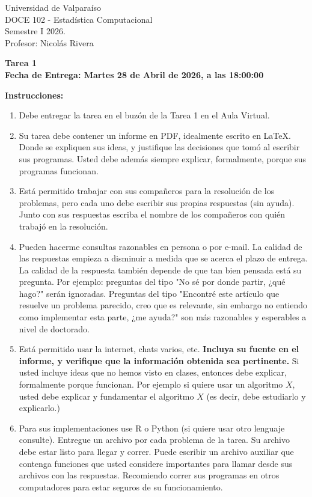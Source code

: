 \documentclass[a4paper,12 pt]{article}
\theoremstyle{definition}
\begin{document}
\begin{flushleft}
\Large{ Universidad de Valpara\'iso \\
DOCE 102 - Estadística Computacional\\
Semestre I 2026.\\
Profesor: Nicolás Rivera
}
\end{flushleft}

\begin{center}
{\Large \bf Tarea 1}\\
{\large \bf Fecha de Entrega: Martes 28 de Abril de 2026, a las 18:00:00}\\
\end{center}

\textbf{Instrucciones:} 
\begin{enumerate}
\item Debe entregar la tarea en el buzón de la Tarea 1 en el Aula Virtual.
\item Su tarea debe contener un informe en PDF, idealmente escrito en \LaTeX. Donde se expliquen sus ideas, y justifique las decisiones que tomó al escribir sus programas. Usted debe además siempre explicar, formalmente, porque sus programas funcionan.
\item Está permitido trabajar con sus compañeros para la resolución de los problemas, pero cada uno debe escribir sus propias respuestas (sin ayuda). Junto con sus respuestas escriba el nombre de los compañeros con quién trabajó en la resolución.
\item Pueden hacerme consultas razonables en persona o por e-mail. La calidad de las respuestas empieza a disminuir a medida que se acerca el plazo de entrega. La calidad de la respuesta también depende de que tan bien pensada está su pregunta. Por ejemplo: preguntas del tipo "No sé por donde partir, ¿qué hago?" serán ignoradas. Preguntas del tipo "Encontré este artículo que resuelve un problema parecido, creo que es relevante, sin embargo no entiendo como implementar esta parte, ¿me ayuda?" son más razonables y esperables a nivel de doctorado.
\item Está permitido usar la internet, chats varios, etc. \textbf{Incluya su fuente en el informe, y verifique que la información obtenida sea pertinente.} Si usted incluye ideas que no hemos visto en clases, entonces debe explicar, formalmente porque funcionan. Por ejemplo si quiere usar un algoritmo $X$, usted debe explicar y fundamentar el algoritmo $X$ (es decir, debe estudiarlo y explicarlo.)
\item Para sus implementaciones use R o Python (si quiere usar otro lenguaje consulte). Entregue un archivo por cada problema de la tarea. Su archivo debe estar listo para llegar y correr. Puede escribir un archivo auxiliar que contenga funciones que usted considere importantes para llamar desde sus archivos con las respuestas. Recomiendo correr sus programas en otros computadores para estar seguros de su funcionamiento. 

\end{enumerate}
\end{document}
